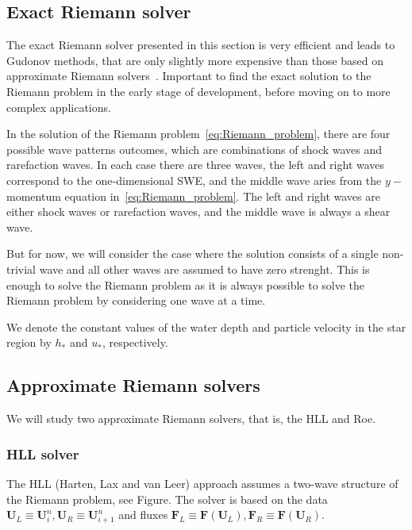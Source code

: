 \subsection{Exact Riemann solver}

The exact Riemann solver presented in this section is very efficient and leads to Gudonov methods, that are only slightly more expensive than those based on approximate Riemann solvers~\cite{Toro2001-Shock}.
Important to find the exact solution to the Riemann problem in the early stage of development, before moving on to more complex applications.


In the solution of the Riemann problem~\eqref{eq:Riemann_problem}, there are four possible wave patterns outcomes, which are combinations of shock waves and rarefaction waves.
In each case there are three waves, the left and right waves correspond to the one-dimensional SWE, and the middle wave aries from the $y-$momentum equation in~\eqref{eq:Riemann_problem}.
The left and right waves are either shock waves or rarefaction waves, and the middle wave is always a shear wave.

But for now, we will consider the case where the solution consists of a single non-trivial wave and all other waves are assumed to have zero strenght.
This is enough to solve the Riemann problem as it is always possible to solve the Riemann problem by considering one wave at a time.

We denote the constant values of the water depth and particle velocity in the star region by $h_*$ and $u_*$, respectively.

\subsection{Approximate Riemann solvers}
We will study two approximate Riemann solvers, that is, the HLL and Roe. 

\subsubsection{HLL solver}
The HLL (Harten, Lax and van Leer) approach assumes a two-wave structure of the Riemann problem, see Figure.
The solver is based on the data $\mathbf{U}_L \equiv \mathbf{U}_i^n, \mathbf{U}_R \equiv \mathbf{U}_{i+1}^n$ and fluxes $\mathbf{F}_L \equiv \mathbf{F}(\mathbf{U}_L), \mathbf{F}_R \equiv \mathbf{F}(\mathbf{U}_R)$.

